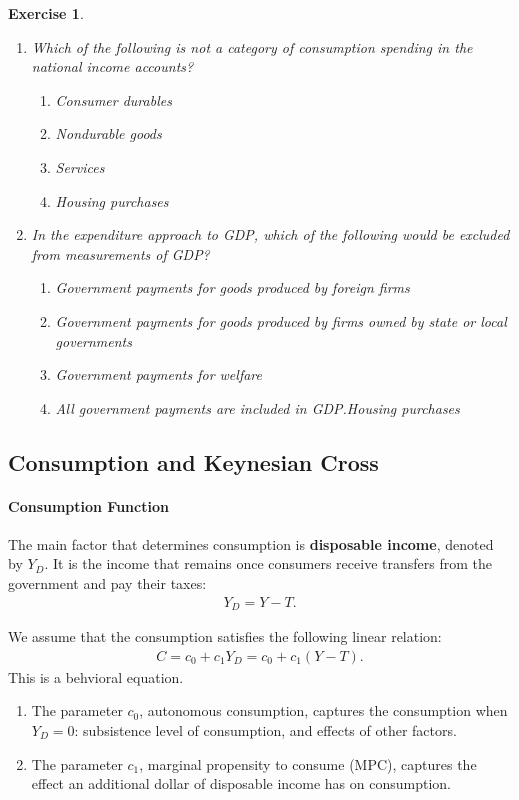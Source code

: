 \documentclass[12pt]{article}
\newtheorem{exercise}{Exercise}
\begin{document}
\begin{exercise}
    \begin{enumerate}[label=(\arabic*)]
        \item Which of the following is not a category of consumption spending in the national income accounts?
        \begin{enumerate}[label=\Alph*.]
            \item Consumer durables
            \item Nondurable goods
            \item Services
            \item Housing purchases
        \end{enumerate}
        \item In the expenditure approach to GDP, which of the following would be excluded from measurements of GDP?
        \begin{enumerate}[label=\Alph*.]
            \item Government payments for goods produced by foreign firms
            \item Government payments for goods produced by firms owned by state or local governments
            \item Government payments for welfare 
            \item All government payments are included in GDP.Housing purchases
        \end{enumerate}
    \end{enumerate}
\end{exercise}

\subsection*{Consumption and Keynesian Cross}
\paragraph{Consumption Function}
The main factor that determines consumption is \textbf{disposable income}, denoted by $Y_D$. It is the income that remains once consumers receive transfers from the government and pay their taxes:
\begin{align*}
    Y_D = Y - T.
\end{align*}

We assume that the consumption satisfies the following linear relation:
\begin{align*}
    C = c_0 + c_1 Y_D = c_0 + c_1 (Y-T).
\end{align*}
This is a behvioral equation. 
\begin{enumerate}
    \item The parameter $c_0$, autonomous consumption, captures the consumption when $Y_D=0$: subsistence level of consumption, and effects of other factors.
    \item The parameter $c_1$, marginal propensity to consume (MPC),
    captures the effect an additional dollar of disposable income has on consumption.
\end{enumerate}
\end{document}
